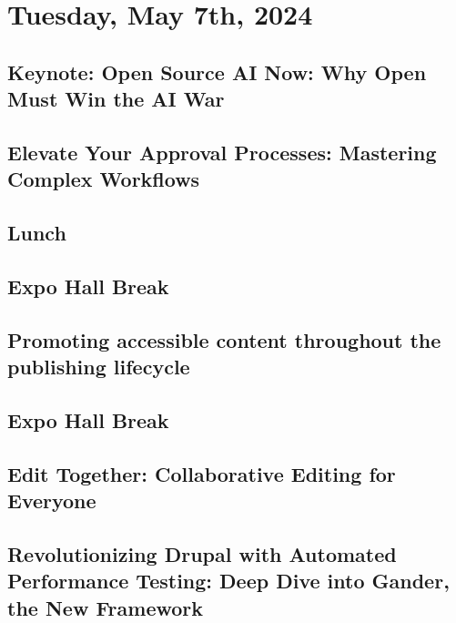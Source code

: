 \section{Tuesday, May 7th, 2024}\label{sec:day2}

\subsection[10:00-11:00:Keynote: Open Source AI Now: Why Open Must Win the AI War]{Keynote: Open Source AI Now: Why Open Must Win the AI War}\label{subsec:keynote1}

\subsection[11:30-12:20: Elevate Your Approval Processes: Mastering Complex Workflows]{Elevate Your Approval Processes: Mastering Complex Workflows}\label{subsec:session5}

\subsection[12:20-13:20: Lunch]{Lunch}\label{subsec:lunchd2}

\subsection[13:20-13:50: Expo Hall Break]{Expo Hall Break}\label{subsec:breakd2b1}

\subsection[13:50-14:40: Promoting accessible content throughout the publishing lifecycle]{Promoting accessible content throughout the publishing lifecycle}\label{subsec:session6}

\subsection[14:40-15:00: Expo Hall Break]{Expo Hall Break}\label{subsec:breakd2b2}

\subsection[15:00-15:50: Edit Together: Collaborative Editing for Everyone]{Edit Together: Collaborative Editing for Everyone}\label{subsec:session7}

\subsection[16:10-1700: Revolutionizing Drupal with Automated Performance Testing: Deep Dive into Gander, the New Framework]{Revolutionizing Drupal with Automated Performance Testing: Deep Dive into Gander, the New Framework}\label{subsec:session8}

\newpage
